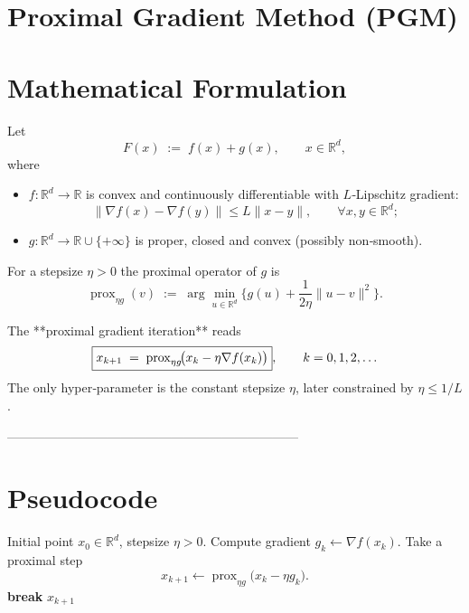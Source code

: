 \documentclass{article}
\newcommand{\prox}{\operatorname{prox}}
\newcommand{\R}{\mathbb{R}}
\begin{document}
\section*{Proximal Gradient Method (PGM)}

\section*{Mathematical Formulation}
Let  
\[
F(x)\;:=\;f(x)+g(x),\qquad x\in\R^{d},
\]
where  

\begin{itemize}[noitemsep]
\item $f:\R^{d}\!\to\!\R$ is convex and continuously differentiable with $L$‑Lipschitz gradient:
\[
\|\nabla f(x)-\nabla f(y)\|\le L\|x-y\|,\qquad\forall x,y\in\R^{d};
\]
\item $g:\R^{d}\!\to\!\R\cup\{+\infty\}$ is proper, closed and convex (possibly non‑smooth).
\end{itemize}
For a stepsize $\eta>0$ the proximal operator of $g$ is
\[
\prox_{\eta g}(v)\;:=\;\arg\min_{u\in\R^{d}}\Big\{g(u)+\frac{1}{2\eta}\|u-v\|^{2}\Big\}.
\]

The **proximal gradient iteration** reads
\begin{equation}
\boxed{%
x_{k+1}\;=\;\prox_{\eta g}\!\bigl(x_{k}-\eta\nabla f(x_{k})\bigr)},
\qquad k=0,1,2,\dots
\label{eq:pgm}
\end{equation}
The only hyper‑parameter is the constant stepsize $\eta$, later constrained by $\eta\le 1/L$.

---------------------------------------------------------------------

\section*{Pseudocode}
\begin{algorithm}[H]
\caption{Proximal Gradient Method}
\begin{algorithmic}[1]
\REQUIRE Initial point $x_{0}\in\R^{d}$, stepsize $\eta>0$.
    \STATE Compute gradient $g_{k}\gets \nabla f(x_{k})$.
    \STATE Take a proximal step 
    \[
    x_{k+1}\gets \prox_{\eta g}\!\bigl(x_{k}-\eta g_{k}\bigr).
    \]
        \STATE \textbf{break}
    \ENDIF
\ENDFOR
\RETURN $x_{k+1}$
\end{algorithmic}
\end{algorithm}
\end{document}
